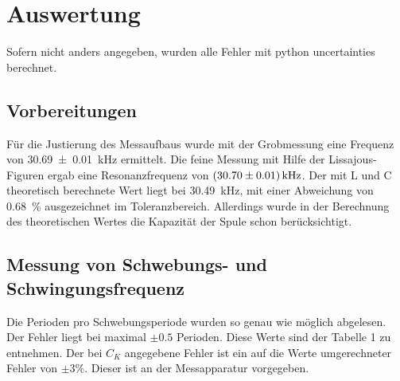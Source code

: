 \documentclass[11pt,ngerman,a4paper]{article}
\begin{document}
\section{Auswertung}


Sofern nicht anders angegeben, wurden alle Fehler mit python uncertainties berechnet.
\subsection{Vorbereitungen}
Für die Justierung des Messaufbaus wurde mit der Grobmessung eine Frequenz von \SI{30,69+-0,01}{\kilo\hertz} ermittelt. Die feine Messung mit Hilfe der Lissajous-Figuren ergab eine Resonanzfrequenz von $\SI{30,70+-0,01}{\kilo\hertz}$. Der mit L und C theoretisch berechnete Wert liegt bei \SI{30,49}{\kilo\hertz}, mit einer Abweichung von \SI{0,68}{\percent} ausgezeichnet im Toleranzbereich. Allerdings wurde in der Berechnung des theoretischen Wertes die Kapazität der Spule schon berücksichtigt.
\subsection{Messung von Schwebungs- und Schwingungsfrequenz}
Die Perioden pro Schwebungsperiode wurden so genau wie möglich abgelesen. Der Fehler liegt bei maximal $\pm 0.5$ Perioden. Diese Werte sind der Tabelle 1 zu entnehmen. Der bei $C_K$ angegebene Fehler ist ein auf die Werte umgerechneter Fehler von $\pm 3 \%$. Dieser ist an der Messapparatur vorgegeben.
\end{document}
